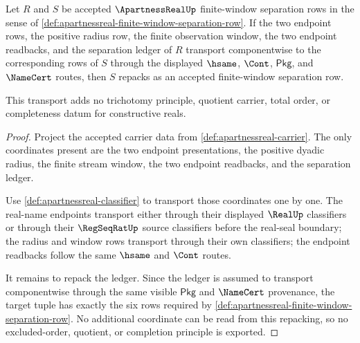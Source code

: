 \begin{theorem}
\label{thm:apartnessreal-finite-window-separation-transport}
Let $R$ and $S$ be accepted $\ApartnessRealUp$ finite-window separation rows in the sense of \autoref{def:apartnessreal-finite-window-separation-row}. If the two endpoint rows, the positive radius row, the finite observation window, the two endpoint readbacks, and the separation ledger of $R$ transport componentwise to the corresponding rows of $S$ through the displayed $\hsame$, $\Cont$, $\mathsf{Pkg}$, and $\NameCert$ routes, then $S$ repacks as an accepted finite-window separation row.

This transport adds no trichotomy principle, quotient carrier, total order, or completeness datum for constructive reals.
\end{theorem}
\begin{proof}
Project the accepted carrier data from \autoref{def:apartnessreal-carrier}. The only coordinates present are the two endpoint presentations, the positive dyadic radius, the finite stream window, the two endpoint readbacks, and the separation ledger.

Use \autoref{def:apartnessreal-classifier} to transport those coordinates one by one. The real-name endpoints transport either through their displayed $\RealUp$ classifiers or through their $\RegSeqRatUp$ source classifiers before the real-seal boundary; the radius and window rows transport through their own classifiers; the endpoint readbacks follow the same $\hsame$ and $\Cont$ routes.

It remains to repack the ledger. Since the ledger is assumed to transport componentwise through the same visible $\mathsf{Pkg}$ and $\NameCert$ provenance, the target tuple has exactly the six rows required by \autoref{def:apartnessreal-finite-window-separation-row}. No additional coordinate can be read from this repacking, so no excluded-order, quotient, or completion principle is exported.
\end{proof}

